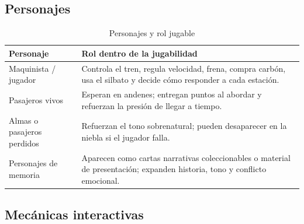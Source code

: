 \documentclass[12pt,letterpaper]{article}
\begin{document}
\subsection{Personajes}

\begin{table}[H]
\centering
\caption{Personajes y rol jugable}
\small
\begin{tabularx}{\textwidth}{L{4cm}Y}
\toprule
\textbf{Personaje} & \textbf{Rol dentro de la jugabilidad} \\
\midrule
Maquinista / jugador & Controla el tren, regula velocidad, frena, compra carbón, usa el silbato y decide cómo responder a cada estación. \\
Pasajeros vivos & Esperan en andenes; entregan puntos al abordar y refuerzan la presión de llegar a tiempo. \\
Almas o pasajeros perdidos & Refuerzan el tono sobrenatural; pueden desaparecer en la niebla si el jugador falla. \\
Personajes de memoria & Aparecen como cartas narrativas coleccionables o material de presentación; expanden historia, tono y conflicto emocional. \\
\bottomrule
\end{tabularx}
\end{table}

\subsection{Mecánicas interactivas}
\end{document}
